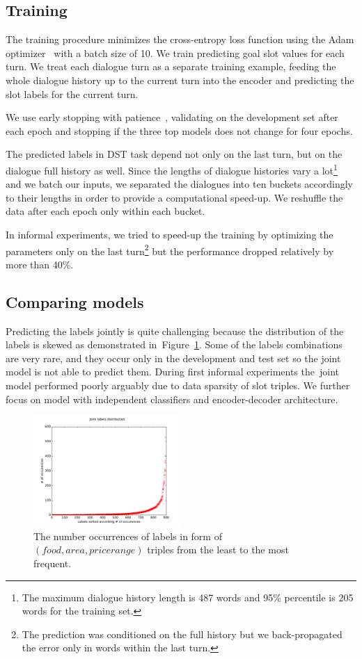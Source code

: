 \documentclass{itatnew}
\begin{document}
\subsection{Training}
\label{sec:train}
The training procedure minimizes the cross-entropy loss function using the Adam optimizer~\cite{kingma2014adam} with a batch size of 10.
We train predicting goal slot values for each turn.
We treat each dialogue turn as a separate training example, feeding the whole dialogue history up to the current turn into the encoder and predicting the slot labels for the current turn.

We use early stopping with patience~\cite{prechelt1998early}, validating on the development set after each epoch and stopping if the three top models does not change for four epochs.

The predicted labels in DST task depend not only on the last turn, but on the dialogue full history as well.
Since the lengths of dialogue histories vary a lot\footnote{The maximum dialogue history length is 487 words and 95\% percentile is 205 words for the training set.} and we batch our inputs, we separated the dialogues into ten buckets accordingly to their lengths in order to provide a computational speed-up. We reshuffle the data after each epoch only within each bucket.

In informal experiments, we tried to speed-up the training by  optimizing the parameters only on the last turn\footnote{The prediction was conditioned on the full history but we back-propagated the error only in words within the last turn.} but the performance dropped relatively by more than 40\%.

\subsection{Comparing models}
\label{sec:eval}

Predicting the labels jointly is quite challenging because the distribution of the labels is skewed as demonstrated in~Figure~\ref{fig:labels}.
Some of the labels combinations are very rare, and they occur only in the development and test set so the joint model is not able to predict them.
During first informal experiments the~joint model performed poorly arguably due to data sparsity of slot triples. We further focus on model with independent classifiers and encoder-decoder architecture.

\begin{figure}
\includegraphics[width=0.5\textwidth]{jointLabelsDistrib}
\caption{The number occurrences of labels in form of $(food, area, pricerange)$ triples from the least to the most frequent.}
\label{fig:labels}
\end{figure}
\end{document}
